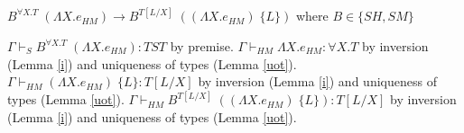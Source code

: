 \begin{case}
$B^{\forall X.T}\;(\Lambda X.e_{HM})\rightarrow B^{T[L/X]}\;((\Lambda X.e_{HM})\;\lbrace L\rbrace)$ where $B\in\lbrace SH,SM\rbrace$

$\Gamma\vdash_{S}B^{\forall X.T}\;(\Lambda X.e_{HM}):TST$ by premise.  $\Gamma\vdash_{HM}\Lambda X.e_{HM}:\forall X.T$ by inversion (Lemma \ref{i}) and uniqueness of types (Lemma \ref{uot}).  $\Gamma\vdash_{HM}(\Lambda X.e_{HM})\;\lbrace L\rbrace:T[L/X]$ by inversion (Lemma \ref{i}) and uniqueness of types (Lemma \ref{uot}).  $\Gamma\vdash_{HM}B^{T[L/X]}\;((\Lambda X.e_{HM})\;\lbrace L\rbrace):T[L/X]$ by inversion (Lemma \ref{i}) and uniqueness of types (Lemma \ref{uot}).
\end{case}